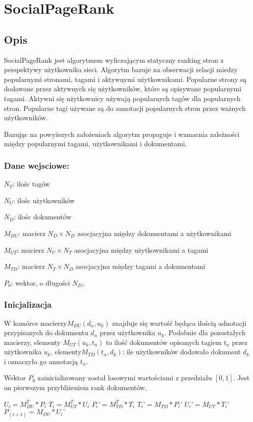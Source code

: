 \chapter{SocialPageRank}
\section{Opis}
SocialPageRank jest algorytmem wyliczającym statyczny ranking stron z perspektywy użytkownika sieci. Algorytm bazuje na obserwacji relacji miedzy popularnymi stronami, tagami i aktywnymi użytkownikami. Popularne strony są dodawane przez aktywnych się użytkowników, które są opisywane popularnymi tagami. Aktywni się użytkownicy używają popularnych tagów dla popularnych stron. Popularne tagi używane są do annotacji popularnych stron przez ważnych użytkowników.

Bazując na powyższych założeniach algorytm propaguje i wzmacnia zależności między popularnymi tagami, użytkownikami i dokumentami. 
\subsection*{Dane wejsciowe:}
$N_T$: ilośc tagów

$N_U$: ilośc użytkowników

$N_D$: ilośc dokumentów

$M_{DU}$: macierz $N_D \times N_D$ asocjacyjna między dokumentami a użytkownikami

$M_{UT}$: macierz $N_U \times N_T$  asocjacyjna między użytkownikami a tagami

$M_{TD}$: macierz $N_T \times N_D$ asocjacyjna między tagami a dokumentami

$P_0$: wektor, o długości $N_D$, 

\subsection*{Inicjalizacja}
W komórce macierzy$M_{DU}(d_n, u_k)$ znajduje się wartość będąca ilością adnotacji przypisanych do dokumentu $d_n$ przez użytkownika $u_k$. Podobnie dla pozostałych macierzy, elementy $M_{UT}(u_k, t_n)$ to ilość dokumentów opisanych tagiem $t_n$ przez użytkownika $u_k$, elementy$M_{TD}(t_n, d_k)$: ile użytkowników dodawało dokument $d_k$ i oznaczyło go annotacją $t_n$. 

Wektor $P_0$ zainicializowany został losowymi wartościami z przedziału $[0,1]$. Jest on pierwszym przybliżeniem rank dokumentów.


\begin{algorithmic}
\REPEAT
\STATE $U_i = M_{DU}^T * P_i$
\STATE $T_i = M_{UT}^T * U_i$
\STATE $P_i’ = M_{TD}^T * T_i$
\STATE $T_i’ = M_{TD}  * P_i’$
\STATE $U_i’ = M_{UT} * T_i’$
\STATE $P_(i+1) = M_{DU} * U_i’$
\end{algorithmic}

